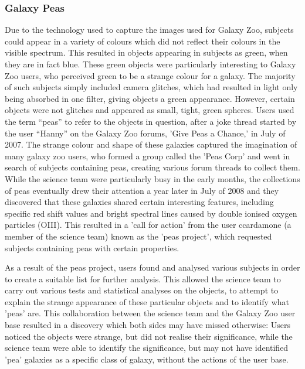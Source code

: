 \documentclass{sigchi}
\begin{document}
\subsubsection{Galaxy Peas}
Due to the technology used to capture the images used for Galaxy Zoo, subjects could appear in a variety of colours which did not reflect their colours in the visible spectrum. This resulted in objects appearing in subjects as green, when they are in fact blue. These green objects were particularly interesting to Galaxy Zoo users, who perceived green to be a strange colour for a galaxy.  The majority of such subjects simply included camera glitches, which had resulted in light only being absorbed in one filter, giving objects a green appearance. However, certain objects were not glitches and appeared as small, tight, green spheres. Users used the term “peas” to refer to the objects in question, after a joke thread started by the user “Hanny” on the Galaxy Zoo forums, 'Give Peas a Chance,' in July of 2007. The strange colour and shape of these galaxies captured the imagination of many galaxy zoo users, who formed a group called the 'Peas Corp' and went in search of subjects containing peas, creating various forum threads to collect them. While the science team were particularly busy in the early months, the collections of peas eventually drew their attention a year later in July of 2008 and they discovered that these galaxies shared  certain interesting features, including specific red shift values and bright spectral lines caused by double ionised oxygen particles (OIII). This resulted in a 'call for action' from the user ccardamone (a member of the science team) known as the 'peas project', which requested subjects containing peas with certain properties.

As a result of the peas project, users found and analysed various subjects in order to create a suitable list for further analysis. This allowed the science team to carry out various tests and statistical analyses on the objects, to attempt to explain the strange appearance of these particular objects and to identify what 'peas' are. This collaboration between the science team and the Galaxy Zoo user base resulted in a discovery which both sides may have missed otherwise: Users noticed the objects were strange, but did not realise their significance, while the science team were able to identify the significance, but may not have identified 'pea' galaxies as a specific class of galaxy, without the actions of the user base.

\end{document}
